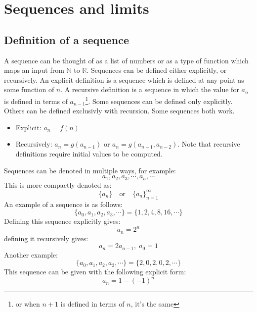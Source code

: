 \documentclass[11pt, a4paper]{article}
\newcommand*{\R}{\ensuremath{\mathbb{R}}}
\newcommand*{\N}{\ensuremath{\mathbb{N}}}
\begin{document}
\setcounter{section}{0}

\section{Sequences and limits}


\subsection{Definition of a sequence}
A sequence can be thought of as a list of numbers or as a type of function which maps an input from $\N$ to $\R$. Sequences can be defined either explicitly, or recursively. An explicit definition is a sequence which is defined at any point as some function of $n$. A recursive definition is a sequence in which the value for $a_n$ is defined in terms of $a_{n-1}$\footnote{or when $n+1$ is defined in terms of $n$, it's the same}. Some sequences can be defined only explicitly. Others can be defined exclusivly with recursion. Some sequences both work.
\begin{itemize}
  \item Explicit: $a_n = f(n)$
  \item Recursively: $a_n = g(a_{n-1})$ or $a_n = g(a_{n-1}, a_{n-2})$. Note that recursive definitions require initial values to be computed.
\end{itemize}
Sequences can be denoted in multiple ways, for example:
\begin{equation*}
  a_1,a_2,a_3,\cdots,a_n,\cdots
\end{equation*}
This is more compactly denoted as:
\begin{equation*}
  \{ a_n\} \quad \text{or} \quad \{ a_n \}_{n=1}^\infty
\end{equation*}
An example of a sequence is as follows:
\begin{equation*}
  \{a_0, a_1, a_2, a_3, \cdots \} = \{1, 2, 4, 8, 16, \cdots \}
\end{equation*}
Defining this sequence explicitly gives:
\begin{equation*}
  a_n = 2^n
\end{equation*}
defining it recursively gives:
\begin{equation*}
  a_n = 2a_{n-1}, \; a_0 = 1
\end{equation*}
Another example:
\begin{equation*}
  \{a_0, a_1, a_2, a_3, \cdots \} = \{2, 0, 2, 0, 2, \cdots \}
\end{equation*}
This sequence can be given with the following explicit form:
\begin{equation*}
  a_n = 1 - (-1)^n
\end{equation*}
\end{document}
